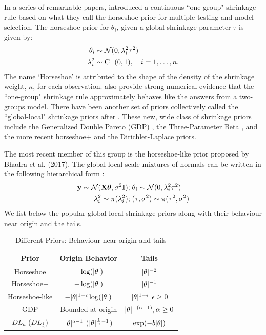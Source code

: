 \documentclass[11pt]{article}
\numberwithin{equation}{section}
\begin{document}
In a series of remarkable papers, \citet*{carvalho2009handling, carvalho2010horseshoe, polson2010shrink, polson2012half} introduced a continuous ``one-group" shrinkage rule based on what they call the horseshoe prior for multiple testing and model selection. The horseshoe prior for $\theta_i$, given a global shrinkage parameter $\tau$ is given by: 
\begin{align}
\theta_i & \sim {\cal N}(0, \lambda_i^2 \tau^2) \nonumber \\
\lambda_i ^2 & \sim \operatorname{C}^{+}(0,1), \quad i = 1, \ldots, n. \label{eq:hs}
\end{align}
The name `Horseshoe' is attributed to the shape of the density of the shrinkage weight, $\kappa$, for each observation. \citet{carvalho2010horseshoe} also provide strong numerical evidence that the ``one-group" shrinkage rule approximately behaves like the answers from a two-groups model. There have been another set of priors collectively called the ``global-local" shrinkage priors after \cite{polson2010shrink}. These new, wide class of shrinkage priors include the Generalized Double Pareto (GDP) \citep{armagan2013generalized}, the Three-Parameter Beta \citep{armagan2011generalized}, and the more recent horseshoe+ \citep{bhadra2015horseshoe+} and the Dirichlet-Laplace \citep{bhattacharya2014dirichlet} priors. 

The most recent member of this group is the horseshoe-like prior proposed by Bhadra et al. (2017). The global-local scale mixtures of normals can be written in the following hierarchical form \citep{polson2010shrink}: 
\begin{align*}
{\bf y} \sim {\cal N}({\bf X}\boldsymbol{\theta}, \sigma^2 {\bf I}) ; & \; \theta_i \sim {\cal N}(0, \lambda_i^2 \tau^2) \\
\lambda_i^2 \sim \pi(\lambda_i^2) ; & \; (\tau,\sigma^2) \sim  \pi(\tau^2,\sigma^2)
\end{align*}
We list below the popular global-local shrinkage priors along with their behaviour near origin and the tails. 
\begin{table}%
\centering
\begin{tabular}{| c | c |c |}
\hline
Prior & Origin Behavior & Tails \\
\hline 
Horseshoe & $-\log(\lvert\theta\rvert)$ & $\lvert\theta\rvert^{-2}$ \\
Horseshoe+ & $-\log(\lvert\theta\rvert)$ & $\lvert\theta\rvert^{-1}$ \\
Horseshoe-like & $-\lvert\theta\rvert^{1-\epsilon}\log(\lvert\theta\rvert)$ & $\lvert\theta\rvert^{1-\epsilon}$ $\epsilon \ge 0$\\
GDP & Bounded at origin & $\lvert\theta\rvert^{-(\alpha + 1)}, \alpha \ge 0$ \\
$DL_{a}$ ($DL_{\frac{1}{n}}$) & $\lvert\theta\rvert^{a-1}$ ($\lvert\theta\rvert^{\frac{1}{n}-1}$) & $\exp(-b\lvert\theta\rvert)$ \\
\hline
\end{tabular}
\caption{Different Priors: Behaviour near origin and tails}
\label{tab:priors}
\end{table}
\end{document}
